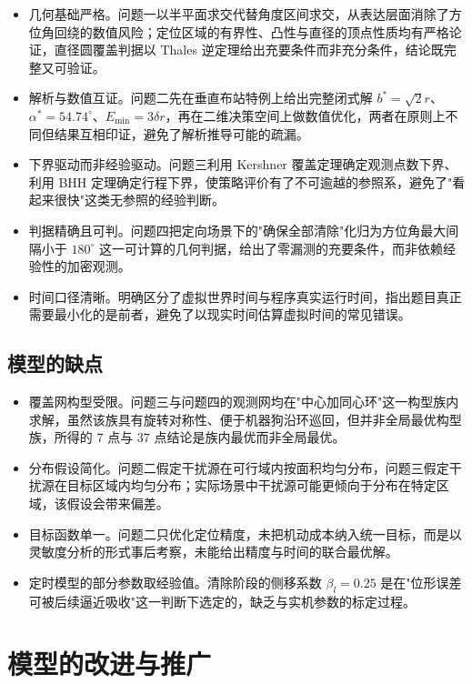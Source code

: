 \documentclass[12pt,a4paper]{ctexart}
\begin{document}
\begin{itemize}[itemindent=2em]
\item 几何基础严格。问题一以半平面求交代替角度区间求交，从表达层面消除了方位角回绕的数值风险；定位区域的有界性、凸性与直径的顶点性质均有严格论证，直径圆覆盖判据以 Thales 逆定理给出充要条件而非充分条件，结论既完整又可验证。
\item 解析与数值互证。问题二先在垂直布站特例上给出完整闭式解 $b^*=\sqrt2r$、$\alpha^*=54.74^\circ$、$E_{\min}=3\delta r$，再在二维决策空间上做数值优化，两者在原则上不同但结果互相印证，避免了解析推导可能的疏漏。
\item 下界驱动而非经验驱动。问题三利用 Kershner 覆盖定理确定观测点数下界、利用 BHH 定理确定行程下界，使策略评价有了不可逾越的参照系，避免了"看起来很快"这类无参照的经验判断。
\item 判据精确且可判。问题四把定向场景下的"确保全部清除"化归为方位角最大间隔小于 $180^\circ$ 这一可计算的几何判据，给出了零漏测的充要条件，而非依赖经验性的加密观测。
\item 时间口径清晰。明确区分了虚拟世界时间与程序真实运行时间，指出题目真正需要最小化的是前者，避免了以现实时间估算虚拟时间的常见错误。
\end{itemize}

\subsection{模型的缺点}

\begin{itemize}[itemindent=2em]
\item 覆盖网构型受限。问题三与问题四的观测网均在"中心加同心环"这一构型族内求解，虽然该族具有旋转对称性、便于机器狗沿环巡回，但并非全局最优构型族，所得的 $7$ 点与 $37$ 点结论是族内最优而非全局最优。
\item 分布假设简化。问题二假定干扰源在可行域内按面积均匀分布，问题三假定干扰源在目标区域内均匀分布；实际场景中干扰源可能更倾向于分布在特定区域，该假设会带来偏差。
\item 目标函数单一。问题二只优化定位精度，未把机动成本纳入统一目标，而是以灵敏度分析的形式事后考察，未能给出精度与时间的联合最优解。
\item 定时模型的部分参数取经验值。清除阶段的侧移系数 $\beta_l=0.25$ 是在"位形误差可被后续逼近吸收"这一判断下选定的，缺乏与实机参数的标定过程。
\end{itemize}

\section{模型的改进与推广}
\end{document}
